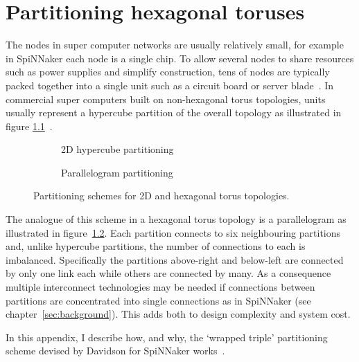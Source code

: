 \chapter{Partitioning hexagonal toruses}
	
	\label{sec:partitioning}
	
	The nodes in super computer networks are usually relatively small, for
	example in SpiNNaker each node is a single chip. To allow several nodes to
	share resources such as power supplies and simplify construction, tens of
	nodes are typically packed together into a single unit such as a circuit
	board or server blade~\cite{gilge14,ajima12}. In commercial super computers
	built on non-hexagonal torus topologies, units usually represent a hypercube
	partition of the overall topology as illustrated in figure
	\ref{fig:apdx-hypercube-partitioning}~\cite{chen11,ajima12}.
	
	\begin{figure}
		\center
		\begin{subfigure}[b]{0.45\textwidth}
			\center
			\caption{2D hypercube partitioning}
			\label{fig:apdx-hypercube-partitioning}
		\end{subfigure}
		\begin{subfigure}[b]{0.45\textwidth}
			\center
			\caption{Parallelogram partitioning}
			\label{fig:apdx-parallelogram-partitioning}
		\end{subfigure}
		
		\caption{Partitioning schemes for 2D and hexagonal torus topologies.}
		\label{fig:apdx-partitioning-options}
	\end{figure}
	
	
	The analogue of this scheme in a hexagonal torus topology is a parallelogram
	as illustrated in figure~\ref{fig:apdx-parallelogram-partitioning}.  Each
	partition connects to six neighbouring partitions and, unlike hypercube
	partitions, the number of connections to each is imbalanced.  Specifically
	the partitions above-right and below-left are connected by only one link each
	while others are connected by many. As a consequence multiple interconnect
	technologies may be needed if connections between partitions are concentrated
	into single connections as in SpiNNaker (see chapter~\ref{sec:background}).
	This adds both to design complexity and system cost.
	
	In this appendix, I describe how, and why, the `wrapped triple' partitioning
	scheme devised by Davidson for SpiNNaker works~\cite{davidsonWiring}.
	
